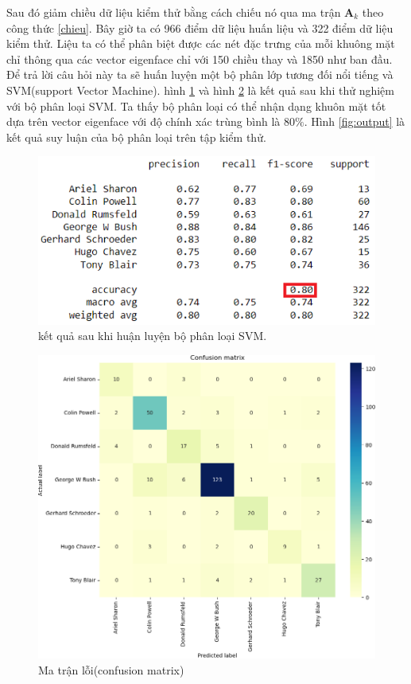 \documentclass[14pt,oneside,a4paper]{report}
\numberwithin{equation}{section}
\begin{document}
Sau đó giảm chiều dữ liệu kiểm thử bằng cách chiếu nó qua ma trận $\mathbf{A}_k$ theo công thức \ref{chieu}.
Bây giờ ta có 966 điểm dữ liệu huấn liệu và 322 điểm dữ liệu kiểm thử. Liệu ta có thể phân biệt được các nét đặc trưng của mỗi khuông mặt chỉ thông qua các vector eigenface chỉ với 150 chiều thay và 1850 như ban đầu.
Để trả lời câu hỏi này ta sẽ huấn luyện một bộ phân lớp tương đối nổi tiếng và SVM(support Vector Machine).
hình \ref{fig:svm_result} và hình \ref{fig:headmap}  là kết quả sau khi thử nghiệm với bộ phân loại SVM. Ta thấy bộ phân loại có thể nhận dạng khuôn mặt tốt dựa trên vector eigenface với độ chính xác trùng bình là $80\%$. Hình \ref{fig:output} là kết quả suy luận của bộ phân loại trên tập kiểm thử.
\begin{figure}[htp]
\centering
\includegraphics[scale=0.8]{result_svm.png}
\caption{kết quả sau khi huận luyện bộ phân loại SVM.}
\label{fig:svm_result}
\end{figure}
\begin{figure}[htp]
\centering
\includegraphics[scale=0.8]{heatmap.png}
\caption{Ma trận lỗi(confusion matrix)}
\label{fig:headmap}
\end{figure}
\end{document}
